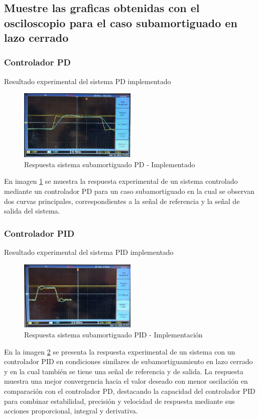 \documentclass[conference]{IEEEtran}
\begin{document}
	\subsection{\textbf{Muestre las graficas obtenidas con el osciloscopio para el caso subamortiguado en lazo cerrado}}
	
	\subsubsection{\textbf{Controlador PD}}
	Resultado experimental del sistema PD implementado
	\begin{figure}[h]
		\centering
		\includegraphics[width=0.5\textwidth]{media/respuesta-sub-implementacion}
		\caption{Respuesta sistema subamortiguado PD - Implementado}
		\label{fig:respuesta-sub-implementacion}
	\end{figure}
	En imagen \ref{fig:respuesta-sub-implementacion} se muestra la respuesta experimental de un sistema controlado mediante un controlador PD para un caso subamortiguado en la cual se observan dos curvas principales, correspondientes a la señal de referencia y la señal de salida del sistema.
	
	\subsubsection{\textbf{Controlador PID}}
	Resultado experimental del sistema PID implementado
	
	\begin{figure}[h]
		\centering
		\includegraphics[width=0.5\textwidth]{media/respuesta-sub-pid}
		\caption{Respuesta sistema subamortiguado PID - Implementación}
		\label{fig:respuesta-sub-pid}
	\end{figure}
	En la imagen \ref{fig:respuesta-sub-pid} se presenta la respuesta experimental de un sistema con un controlador PID en condiciones similares de subamortiguamiento en lazo cerrado y en la cual también se tiene una señal de referencia y de salida. La respuesta muestra una mejor convergencia hacia el valor deseado con menor oscilación en comparación con el controlador PD, destacando la capacidad del controlador PID para combinar estabilidad, precisión y velocidad de respuesta mediante sus acciones proporcional, integral y derivativa.
	
\end{document}
